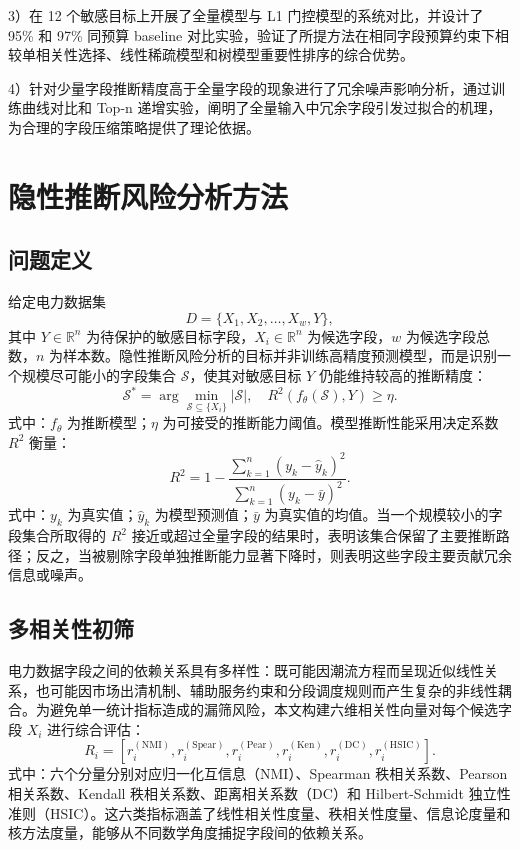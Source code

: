 \documentclass[UTF8,zihao=5,twoside]{ctexart}
\numberwithin{equation}{section}
\newcommand{\metric}[1]{\mathrm{#1}}
\begin{document}
3）在 12 个敏感目标上开展了全量模型与 L1 门控模型的系统对比，并设计了 95\% 和 97\% 同预算 baseline 对比实验，验证了所提方法在相同字段预算约束下相较单相关性选择、线性稀疏模型和树模型重要性排序的综合优势。

4）针对少量字段推断精度高于全量字段的现象进行了冗余噪声影响分析，通过训练曲线对比和 Top-n 递增实验，阐明了全量输入中冗余字段引发过拟合的机理，为合理的字段压缩策略提供了理论依据。

\section{隐性推断风险分析方法}
\subsection{问题定义}
给定电力数据集
\begin{equation}
D=\{X_1,X_2,\ldots,X_w,Y\},
\end{equation}
其中 $Y\in\mathbb{R}^{n}$ 为待保护的敏感目标字段，$X_i\in\mathbb{R}^{n}$ 为候选字段，$w$ 为候选字段总数，$n$ 为样本数。隐性推断风险分析的目标并非训练高精度预测模型，而是识别一个规模尽可能小的字段集合 $\mathcal{S}$，使其对敏感目标 $Y$ 仍能维持较高的推断精度：
\begin{equation}
\mathcal{S}^{*}=\arg\min_{\mathcal{S}\subseteq \{X_i\}}\left|\mathcal{S}\right|,
\quad
R^2(f_{\theta}(\mathcal{S}),Y)\geq \eta .
\end{equation}
式中：$f_{\theta}$ 为推断模型；$\eta$ 为可接受的推断能力阈值。模型推断性能采用决定系数 $R^2$ 衡量：
\begin{equation}
R^2=1-\frac{\sum_{k=1}^{n}(y_k-\hat{y}_k)^2}{\sum_{k=1}^{n}(y_k-\bar{y})^2}.
\end{equation}
式中：$y_k$ 为真实值；$\hat{y}_k$ 为模型预测值；$\bar{y}$ 为真实值的均值。当一个规模较小的字段集合所取得的 $R^2$ 接近或超过全量字段的结果时，表明该集合保留了主要推断路径；反之，当被剔除字段单独推断能力显著下降时，则表明这些字段主要贡献冗余信息或噪声。

\subsection{多相关性初筛}
电力数据字段之间的依赖关系具有多样性：既可能因潮流方程而呈现近似线性关系，也可能因市场出清机制、辅助服务约束和分段调度规则而产生复杂的非线性耦合。为避免单一统计指标造成的漏筛风险，本文构建六维相关性向量对每个候选字段 $X_i$ 进行综合评估：
\begin{equation}
R_i=[r_i^{(\metric{NMI})},r_i^{(\metric{Spear})},r_i^{(\metric{Pear})},
r_i^{(\metric{Ken})},r_i^{(\metric{DC})},r_i^{(\metric{HSIC})}].
\end{equation}
式中：六个分量分别对应归一化互信息（NMI）、Spearman 秩相关系数、Pearson 相关系数、Kendall 秩相关系数、距离相关系数（DC）和 Hilbert-Schmidt 独立性准则（HSIC）。这六类指标涵盖了线性相关性度量、秩相关性度量、信息论度量和核方法度量，能够从不同数学角度捕捉字段间的依赖关系。
\end{document}
